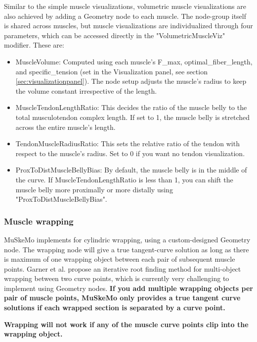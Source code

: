 \documentclass{article}
\begin{document}
Similar to the simple muscle visualizations, volumetric muscle visualizations are also achieved by adding a Geometry node to each muscle. The node-group itself is shared across muscles, but muscle visualizations are individualized through four parameters, which can be accessed directly in the "VolumetricMuscleViz" modifier. These are:

\begin{itemize}
\item{MuscleVolume:} Computed using each muscle's F\_max, optimal\_fiber\_length, and specific\_tension (set in the Visualization panel, see section \ref{sec:visualizationpanel}). The node setup adjusts the muscle's radius to keep the volume constant irrespective of the length.
\item{MuscleTendonLengthRatio: } This decides the ratio of the muscle belly to the total musculotendon complex length. If set to 1, the muscle belly is stretched across the entire muscle's length. 
\item{TendonMuscleRadiusRatio: } This sets the relative ratio of the tendon with respect to the muscle's radius. Set to 0 if you want no tendon visualization.
\item{ProxToDistMuscleBellyBias: } By default, the muscle belly is in the middle of the curve. If MuscleTendonLengthRatio is less than 1, you can shift the muscle belly more proximally or more distally using "ProxToDistMuscleBellyBias".
\end{itemize}


\subsubsection{Muscle wrapping}
\label{sec:musclewrapping}

MuSkeMo implements \cite{garnerObstacleSetMethodRepresenting2000} for cylindric wrapping, using a custom-designed Geometry node. The wrapping node will give a true tangent-curve solution as long as there is maximum of one wrapping object between each pair of subsequent muscle points. Garner et al. \cite{garnerObstacleSetMethodRepresenting2000} propose an iterative root finding method for multi-object wrapping between two curve points, which is currently very challenging to implement using Geometry nodes. \textbf{If you add multiple wrapping objects per pair of muscle points, MuSkeMo only provides a true tangent curve solutions if each wrapped section is separated by a curve point.} 

\textbf{Wrapping will not work if any of the muscle curve points clip into the wrapping object.}
\end{document}
